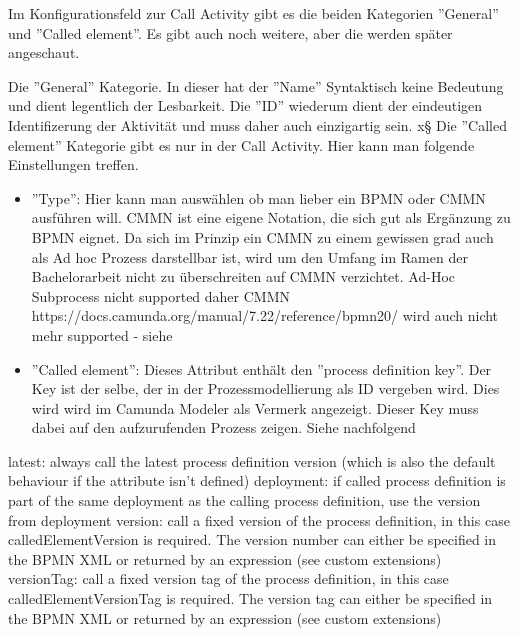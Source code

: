 Im Konfigurationsfeld zur Call Activity gibt es die beiden Kategorien ''General'' und ''Called element''. Es gibt auch noch weitere, aber die werden später angeschaut. 

Die ''General'' Kategorie. In dieser hat der ''Name'' Syntaktisch keine Bedeutung und dient legentlich der Lesbarkeit. Die ''ID'' wiederum dient der eindeutigen Identifizerung der Aktivität und muss daher auch einzigartig sein.
x§
Die ''Called element'' Kategorie gibt es nur in der Call Activity. Hier kann man folgende Einstellungen treffen.

\begin{itemize}
    \item ''Type'': Hier kann man auswählen ob man lieber ein \acs{BPMN} oder \acs{CMMN} ausführen will. \acs{CMMN} ist eine eigene Notation, die sich gut als Ergänzung zu \acs{BPMN} eignet. Da sich im Prinzip ein CMMN zu einem gewissen grad auch als Ad hoc Prozess darstellbar ist, wird um den Umfang im Ramen der Bachelorarbeit nicht zu überschreiten auf \acs{CMMN} verzichtet. Ad-Hoc Subprocess nicht supported daher CMMN
    https://docs.camunda.org/manual/7.22/reference/bpmn20/
    wird auch nicht mehr supported - siehe
    \item ''Called element'': Dieses Attribut enthält den ''process definition key''. Der Key ist der selbe, der in der Prozessmodellierung als ID vergeben wird. Dies wird wird im 
    Camunda Modeler als Vermerk angezeigt. Dieser Key muss dabei auf den aufzurufenden Prozess zeigen. Siehe nachfolgend
\end{itemize}
\clearpage
{}


    latest: always call the latest process definition version (which is also the default behaviour if the attribute isn’t defined)
    deployment: if called process definition is part of the same deployment as the calling process definition, use the version from deployment
    version: call a fixed version of the process definition, in this case calledElementVersion is required. The version number can either be specified in the BPMN XML or returned by an expression (see custom extensions)
    versionTag: call a fixed version tag of the process definition, in this case calledElementVersionTag is required. The version tag can either be specified in the BPMN XML or returned by an expression (see custom extensions)


